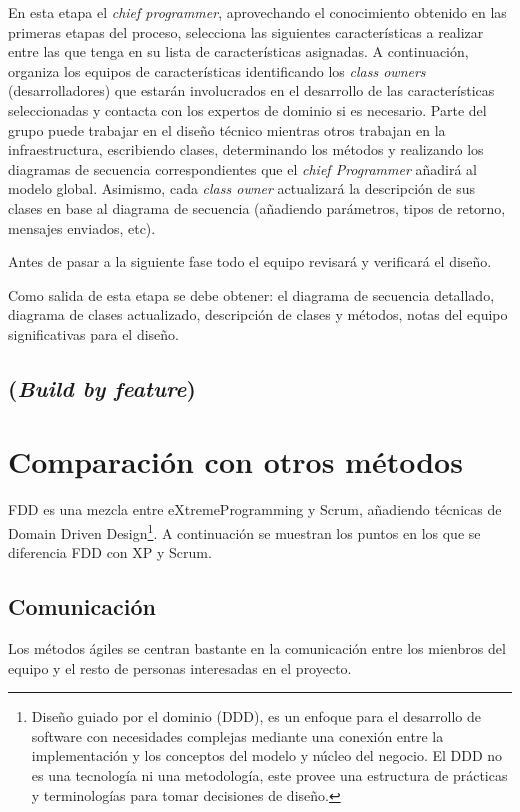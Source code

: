 \documentclass[11pt]{article}
\begin{document}
En esta etapa el \textit{chief programmer}, aprovechando el conocimiento obtenido en las primeras etapas del proceso, selecciona las siguientes características a realizar entre las que tenga en su lista de características asignadas. A continuación, organiza los equipos de características identificando los \textit{class owners} (desarrolladores) que estarán involucrados en el desarrollo de las características seleccionadas y contacta con los expertos de dominio si es necesario. Parte del grupo puede trabajar en el diseño técnico mientras otros trabajan en la infraestructura, escribiendo clases, determinando los métodos y realizando los diagramas de secuencia correspondientes que el \textit{chief Programmer} añadirá al modelo global. Asimismo, cada \textit{class owner} actualizará la descripción de sus clases en base al diagrama de secuencia (añadiendo parámetros, tipos de retorno, mensajes enviados, etc).

Antes de pasar a la siguiente fase todo el equipo revisará y verificará el diseño.

Como salida de esta etapa se debe obtener: el diagrama de secuencia detallado, diagrama de clases actualizado, descripción de clases y métodos, notas del equipo significativas para el diseño.

\subsection{(\textit{Build by feature})}



\section{Comparación con otros métodos}
FDD es una mezcla entre eXtremeProgramming y Scrum, añadiendo técnicas de Domain Driven Design\footnote{Diseño guiado por el dominio (DDD), es un enfoque para el desarrollo de software con necesidades complejas mediante una conexión entre la implementación y los conceptos del modelo y núcleo del negocio. El DDD no es una tecnología ni una metodología, este provee una estructura de prácticas y terminologías para tomar decisiones de diseño.}. A continuación se muestran los puntos en los que se diferencia FDD con XP y Scrum.


\subsection*{Comunicación}
Los métodos ágiles se centran bastante en la comunicación entre los mienbros del equipo y el resto de personas interesadas en el proyecto.
\end{document}

